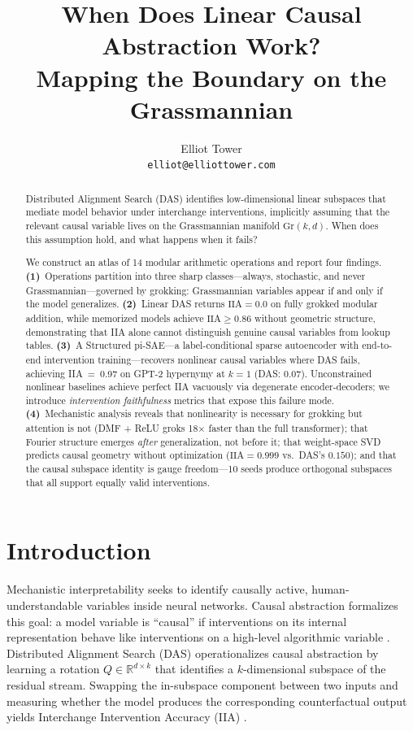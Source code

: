 \documentclass{article}
\title{When Does Linear Causal Abstraction Work?\\
Mapping the Boundary on the Grassmannian}
\author{
Elliot Tower \\
\texttt{elliot@elliottower.com}
}
\newcommand{\Gr}{\mathrm{Gr}}
\newcommand{\IIA}{\mathrm{IIA}}
\newcommand{\R}{\mathbb{R}}
\begin{document}
\maketitle

\begin{abstract}
Distributed Alignment Search (DAS) identifies low-dimensional linear subspaces
that mediate model behavior under interchange interventions, implicitly assuming
that the relevant causal variable lives on the Grassmannian manifold
$\Gr(k,d)$. When does this assumption hold, and what happens when it fails?

We construct an atlas of 14 modular arithmetic operations and report four
findings. \textbf{(1)}~Operations partition into three sharp classes---always,
stochastic, and never Grassmannian---governed by grokking: Grassmannian
variables appear if and only if the model generalizes.
\textbf{(2)}~Linear DAS returns $\IIA = 0.0$ on fully grokked modular
addition, while memorized models achieve $\IIA \geq 0.86$ without geometric
structure, demonstrating that IIA alone cannot distinguish genuine causal
variables from lookup tables.
\textbf{(3)}~A Structured pi-SAE---a label-conditional sparse autoencoder
with end-to-end intervention training---recovers nonlinear causal variables
where DAS fails, achieving IIA~=~0.97 on GPT-2 hypernymy at $k{=}1$ (DAS:
0.07). Unconstrained nonlinear baselines achieve perfect IIA vacuously via
degenerate encoder-decoders; we introduce \emph{intervention faithfulness}
metrics that expose this failure mode.
\textbf{(4)}~Mechanistic analysis reveals that nonlinearity is necessary for
grokking but attention is not (DMF + ReLU groks 18$\times$ faster than the
full transformer); that Fourier structure emerges \emph{after} generalization,
not before it; that weight-space SVD predicts causal geometry without
optimization ($\IIA = 0.999$ vs.\ DAS's $0.150$); and that the causal
subspace identity is gauge freedom---10 seeds produce orthogonal subspaces
that all support equally valid interventions.
\end{abstract}

\section{Introduction}
\label{sec:intro}

Mechanistic interpretability seeks to identify causally active,
human-understandable variables inside neural networks. Causal abstraction
formalizes this goal: a model variable is ``causal'' if interventions on its
internal representation behave like interventions on a high-level algorithmic
variable \citep{geiger2021causal}. Distributed Alignment Search (DAS)
operationalizes causal abstraction by learning a rotation $Q \in \R^{d \times k}$
that identifies a $k$-dimensional subspace of the residual stream. Swapping the
in-subspace component between two inputs and measuring whether the model
produces the corresponding counterfactual output yields Interchange Intervention
Accuracy (IIA) \citep{geiger2023finding}.
\end{document}
